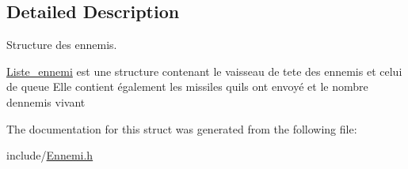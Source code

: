 \subsection{Detailed Description}
Structure des ennemis. 

\hyperlink{struct_liste__ennemi}{Liste\+\_\+ennemi} est une structure contenant le vaisseau de tete des ennemis et celui de queue Elle contient également les missiles qu\textquotesingle{}ils ont envoyé et le nombre d\textquotesingle{}ennemis vivant 

The documentation for this struct was generated from the following file\+:\begin{DoxyCompactItemize}
\item 
include/\hyperlink{_ennemi_8h}{Ennemi.\+h}\end{DoxyCompactItemize}
